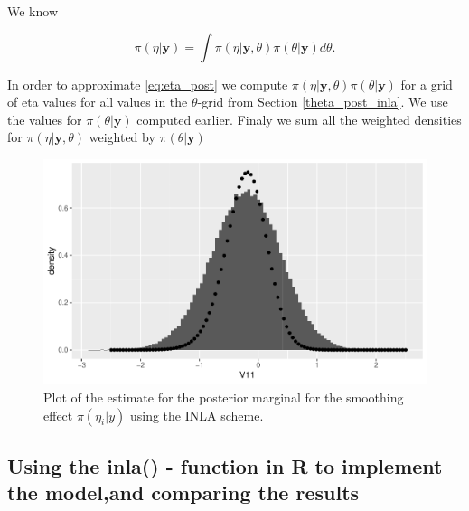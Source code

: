 We know 

\begin{equation}
\label{eq:eta_post}
    \pi(\eta|\boldsymbol{y}) = \int \pi(\eta|\boldsymbol{y}, \theta) \pi(\theta|\boldsymbol{y}) d\theta.
\end{equation}

In order to approximate \eqref{eq:eta_post} we compute $\pi(\eta|\boldsymbol{y}, \theta) \pi(\theta|\boldsymbol{y})$ for a grid of eta values for all values in the $\theta$-grid from Section \ref{theta_post_inla}. We use the values for $\pi(\theta|\boldsymbol{y})$ computed earlier. Finaly we sum all the weighted densities for $\pi(\eta|\boldsymbol{y}, \theta)$ weighted by $\pi(\theta|\boldsymbol{y})$







\begin{figure}[h!]
    \centering
    \includegraphics[width=\textwidth]{Images/post_eta_inla.pdf}
    \caption{Plot of the estimate for the posterior marginal for the smoothing effect $\pi(\eta_i|y)$ using the INLA scheme.}
    \label{fig:post_eta_inla}
\end{figure}



\subsection{Using the inla() - function in R to implement the model,and comparing the results}


